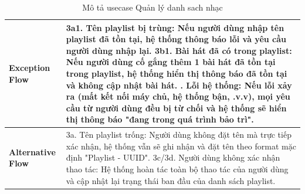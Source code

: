 \documentclass[a4paper]{article}
\begin{document}
\begin{table}[h!]
\begin{tabularx}{\textwidth}{|l|X|}
\textbf{Exception Flow} 
& 3a1. Tên playlist bị trùng: Nếu người dùng nhập tên playlist đã tồn tại, hệ thống thông báo lỗi và yêu cầu người dùng nhập lại. \newline
  3b1. Bài hát đã có trong playlist: Nếu người dùng cố gắng thêm 1 bài hát đã tồn tại trong playlist, hệ thống hiển thị thông báo đã tồn tại và không cập nhật bài hát. \newline
  1. Lỗi hệ thống: Nếu lỗi xảy ra (mất kết nối máy chủ, hệ thống bận, .v.v), mọi yêu cầu từ người dùng đều bị từ chối và hệ thống sẽ hiển thị thông báo "đang trong quá trình bảo trì". \\ \hline
\textbf{Alternative Flow} 
& 3a. Tên playlist trống: Người dùng không đặt tên mà trực tiếp xác nhận, hệ thống vẫn sẽ ghi nhận và đặt tên theo format mặc định "Playlist - UUID".\newline
  3c/3d. Người dùng không xác nhận thao tác: Hệ thống hoàn tác toàn bộ thao tác của người dùng và cập nhật lại trạng thái ban đầu của danh sách playlist. \\ \hline
\end{tabularx}
\caption{Mô tả usecase Quản lý danh sach nhạc}
\end{table}
\end{document}

